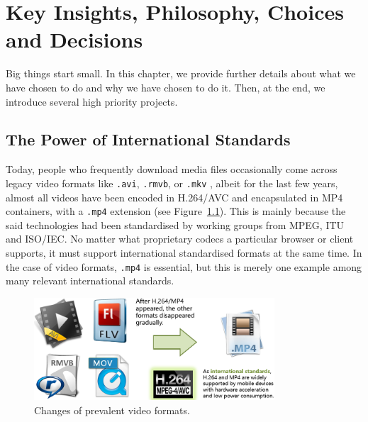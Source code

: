 \chapter{Key Insights, Philosophy, Choices and Decisions}\label{sec-decisions}
Big things start small. In this chapter, we provide further details about what we have chosen to do and why we have chosen to do it. Then, at the end, we introduce several high priority projects. 

\section{The Power of International Standards}
Today, people who frequently download media files occasionally come across legacy video formats like \texttt{.avi}, \texttt{.rmvb}, or \texttt{.mkv} , albeit for the last few years, almost all videos have been encoded in H.264/AVC and encapsulated in MP4 containers, with a \texttt{.mp4} extension (see Figure~\ref{fig:video-formats}). This is mainly because the said technologies had been standardised by working groups from MPEG, ITU and ISO/IEC. No matter what proprietary codecs a particular browser or client supports, it must support international standardised formats at the same time. In the case of video formats, \texttt{.mp4} is essential, but this is merely one example among many relevant international standards.  
\begin{figure}[hbt]
	\centering
	\includegraphics[width=0.80\textwidth]{fig/decisions/video-formats.png} 
	\caption{Changes of prevalent video formats.}\label{fig:video-formats}
\end{figure}

